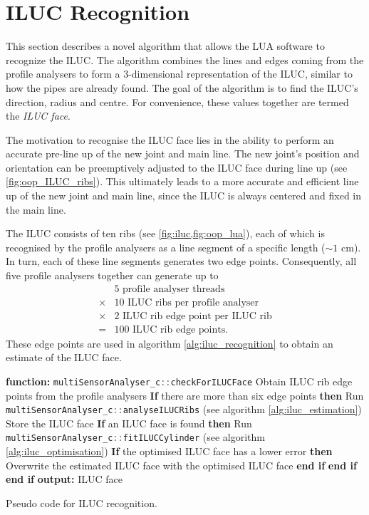 \section{ILUC Recognition} \label{sec:iluc_recognition}
This section describes a novel algorithm that allows the LUA software to recognize the ILUC. The algorithm combines the lines and edges coming from the profile analysers to form a 3-dimensional representation of the ILUC, similar to how the pipes are already found. The goal of the algorithm is to find the ILUC's direction, radius and centre. For convenience, these values together are termed the \textit{ILUC face}.

The motivation to recognise the ILUC face lies in the ability to perform an accurate pre-line up of the new joint and main line. The new joint's position and orientation can be preemptively adjusted to the ILUC face during line up (see \ref{fig:oop_ILUC_ribs}). This ultimately leads to a more accurate and efficient line up of the new joint and main line, since the ILUC is always centered and fixed in the main line.

The ILUC consists of ten ribs (see \cref{fig:iluc,fig:oop_lua}), each of which is recognised by the profile analysers as a line segment of a specific length ($\sim 1$ cm). In turn, each of these line segments generates two edge points. Consequently, all five profile analysers together can generate up to
\begin{align*}
           & 5 \text{ profile analyser threads}         \\
    \times & 10 \text{ ILUC ribs per profile analyser}  \\
    \times & 2 \text{ ILUC rib edge point per ILUC rib} \\
    =      & 100 \text{ ILUC rib edge points}.
\end{align*}
These edge points are used in algorithm \ref{alg:iluc_recognition} to obtain an estimate of the ILUC face.
\begin{algorithm}
    \begin{algorithmic}[1]
        \State \textbf{function: } \lstinline[language=C]|multiSensorAnalyser_c::checkForILUCFace|
        \State Obtain ILUC rib edge points from the profile analysers
        \State \textbf{If} there are more than six edge points \textbf{then}
        \State \quad Run \lstinline[language=C]|multiSensorAnalyser_c::analyseILUCRibs| (see algorithm \ref{alg:iluc_estimation})
        \State \quad Store the ILUC face
        \State \quad \textbf{If} an ILUC face is found \textbf{then}
        \State \quad \quad Run \lstinline[language=C]|multiSensorAnalyser_c::fitILUCCylinder| (see algorithm \ref{alg:iluc_optimisation})
        \State \quad \quad \textbf{If} the optimised ILUC face has a lower error \textbf{then}
        \State \quad \quad \quad Overwrite the estimated ILUC face with the optimised ILUC face
        \State \quad \quad \textbf{end if}
        \State \quad \textbf{end if}
        \State \textbf{end if}
        \State \textbf{output: } ILUC face
    \end{algorithmic}
    \caption{Pseudo code for ILUC recognition.}
    \label{alg:iluc_recognition}
\end{algorithm}


